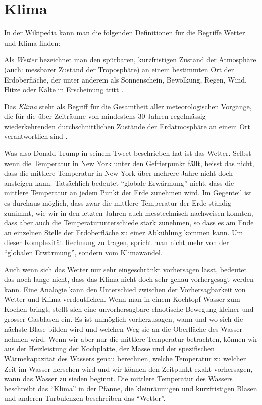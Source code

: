%
%
%

\section{Klima\label{section:klima}}
In der Wikipedia kann man die folgenden Definitionen für die Begriffe Wetter
und Klima finden:

\begin{definition}
Als {\em Wetter} bezeichnet man den
spürbaren, kurzfristigen Zustand der Atmosphäre (auch: messbarer
Zustand der Troposphäre) an einem bestimmten Ort der Erdoberfläche,
der unter anderem als Sonnenschein, Bewölkung, Regen, Wind, Hitze
oder Kälte in Erscheinung tritt
\cite{skript:wetter}.
\end{definition}

\begin{definition}
Das {\em Klima} steht als Begriff für die Gesamtheit aller meteorologischen
Vorgänge, die für die über Zeiträume von mindestens 30 Jahren
regelmässig wiederkehrenden durchschnittlichen Zustände der Erdatmosphäre
an einem Ort verantwortlich sind
\cite{skript:klima}.
\end{definition}

Was also Donald Trump in seinem Tweet beschrieben hat ist das Wetter.
Selbst wenn die Temperatur in New York unter den Gefrierpunkt fällt, 
heisst das nicht, dass die mittlere Temperatur in New York über mehrere
Jahre nicht doch ansteigen kann.
Tatsächlich bedeutet ``globale Erwärmung'' nicht, dass die mittlere
Temperatur an jedem Punkt der Erde zunehmen wird.
Im Gegenteil ist es durchaus möglich, dass zwar die mittlere Temperatur
der Erde ständig zunimmt, wie wir in den letzten Jahren auch messtechnisch
nachweisen konnten, dass aber auch die Temperaturunterschiede stark zunehmen,
so dass es am Ende an einzelnen Stelle der Erdoberfläche zu einer 
Abkühlung kommen kann.
Um dieser Komplexität Rechnung zu tragen, spricht man nicht mehr von
der ``globalen Erwärmung'', sondern vom Klimawandel.

Auch wenn sich das Wetter nur sehr eingeschränkt vorhersagen lässt,
bedeutet das noch lange nicht, dass das Klima nicht doch sehr
genau vorhergesagt werden kann.
Eine Analogie kann den Unterschied zwischen der Vorhersagbarkeit
von Wetter und Klima verdeutlichen.
Wenn man in einem Kochtopf Wasser zum Kochen bringt, stellt sich
eine unvorhersagbare chaotische Bewegung kleiner und grosser
Gasblasen ein.
Es ist unmöglich vorherzusagen, wann und wo sich die nächste Blase
bilden wird und welchen Weg sie an die Oberfläche des Wasser nehmen
wird.
Wenn wir aber nur die mittlere Temperatur betrachten, können wir
aus der Heizleistung der Kochplatte, der Masse und der spezifischen
Wärmekapazität des Wassers genau berechnen, welche Temperatur zu welcher
Zeit im Wasser herschen wird und wir können den Zeitpunkt exakt
vorhersagen, wann das Wasser zu sieden beginnt.
Die mittlere Temperatur des Wassers beschreibt das ``Klima''
in der Pfanne, die kleinräumigen und kurzfristigen Blasen und anderen
Turbulenzen beschreiben das ``Wetter''.

